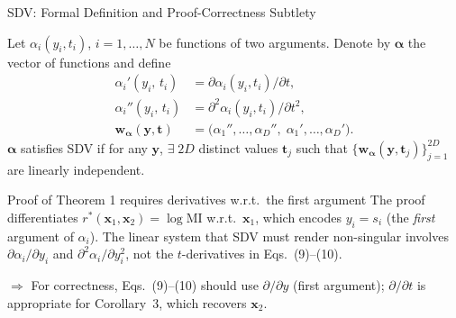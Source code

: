 \documentclass[aspectratio=169, 10pt]{beamer}
\begin{document}
\begin{frame}{SDV: Formal Definition and Proof-Correctness Subtlety}
  \begin{definition}
    Let $\alpha_i(y_i, t_i)$, $i=1,\ldots,N$ be functions of two arguments.
    Denote by $\boldsymbol{\alpha}$ the vector of functions and define
    \begin{align}
      \alpha_i'(y_i,\,t_i) &= \partial\alpha_i(y_i,t_i)/\partial t, \tag{9}\\
      \alpha_i''(y_i,\,t_i) &= \partial^2\alpha_i(y_i,t_i)/\partial t^2, \tag{10}\\
      \mathbf{w}_{\boldsymbol{\alpha}}(\mathbf{y},\mathbf{t})
        &= \bigl(\alpha_1'',\ldots,\alpha_D'',\;\alpha_1',\ldots,\alpha_D'\bigr). \tag{11}
    \end{align}
    $\boldsymbol{\alpha}$ satisfies SDV if for any $\mathbf{y}$, $\exists\; 2D$ distinct values
    $\mathbf{t}_j$ such that $\{\mathbf{w}_{\boldsymbol{\alpha}}(\mathbf{y},\mathbf{t}_j)\}_{j=1}^{2D}$
    are linearly independent.
  \end{definition}

  \begin{alertblock}{Proof of Theorem 1 requires derivatives w.r.t.\ the first argument}
    The proof differentiates $r^*(\mathbf{x}_1,\mathbf{x}_2)=\log\mathrm{MI}$
    w.r.t.\ $\mathbf{x}_1$, which encodes $y_i = s_i$ (the \emph{first} argument of
    $\alpha_i$). The linear system that SDV must render non-singular involves
    $\partial\alpha_i/\partial y_i$ and $\partial^2\alpha_i/\partial y_i^2$, not the
    $t$-derivatives in Eqs.\ (9)--(10).

    \smallskip
    $\Rightarrow$ For correctness, Eqs.\ (9)--(10) should use $\partial/\partial y$
    (first argument); $\partial/\partial t$ is appropriate for Corollary~3, which
    recovers $\mathbf{x}_2$.
  \end{alertblock}
\end{frame}
\end{document}
